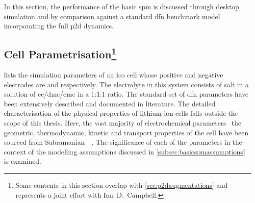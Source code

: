 
In this  section, the performance  of the  basic \gls{spm} is  discussed through
desktop  simulation and  by comparison  against a  standard \gls{dfn}  benchmark
model incorporating the full \gls{p2d} dynamics.


\subsection[Cell   Parametrisation]{Cell   Parametrisation\protect\footnote{Some
contents    in   this    section   overlap    with   \cref{sec:p2daugmentations}
and      represents     a      joint     effort      with     \mbox{Ian      D.\
Campbell}.}}\label{subsec:spmp2dparametrisation}



 lists  the simulation  parameters of  an \gls{lco}
cell  whose positive  and negative  electrodes are  \ch{LiCoO_2} and  \ch{LiC_6}
respectively.  The  electrolyte in  this  system  consists of  \ch{LiPF_6}  salt
in  a   solution  of   \gls{ec}/\gls{dmc}/\gls{emc}  in   a  1:1:1   ratio.  The
standard  set  of  \gls{dfn}  parameters have  been  extensively  described  and
documented  in  literature.  The   detailed  characterisation  of  the  physical
properties  of  lithium-ion  cells  falls  outside the  scope  of  this  thesis.
Here,  the vast  majority of  electrochemical parameters  \viz~the  geometric,
thermodynamic, kinetic  and transport properties  of the cell have  been sourced
from  Subramanian~\etal{}~\cite{Subramanian2009}. The  significance  of each  of
the  parameters  in  the  context  of the  modelling  assumptions  discussed  in
\cref{subsec:basicspmassumptions} is examined.

